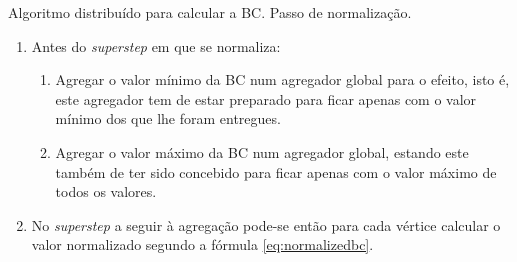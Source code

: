 \begin{algorithm}
  \caption{Algoritmo distribuído para calcular a BC. Passo de normalização.}
  \label{alg:normbc}
  \begin{enumerate} 
    \item Antes do \textit{superstep} em que se normaliza:
    \begin{enumerate}  
      \item Agregar o valor mínimo da BC num agregador global para o 
efeito, isto é, este agregador tem de estar preparado para ficar apenas com o 
valor mínimo dos que lhe foram entregues.
      \item Agregar o valor máximo da BC num agregador global, estando este 
também de ter sido concebido para ficar apenas com o valor máximo de todos os 
valores.
    \end{enumerate}
    \item No \textit{superstep} a seguir à agregação pode-se então para 
cada vértice calcular o valor normalizado segundo a fórmula 
\ref{eq:normalizedbc}.
  \end{enumerate}
\end{algorithm}


\clearpage
